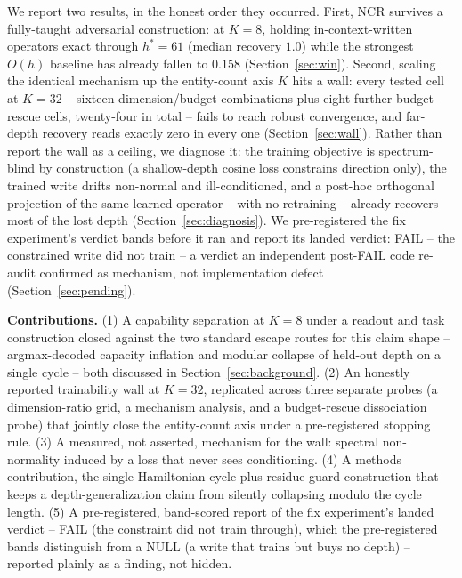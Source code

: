 We report two results, in the honest order they occurred. First, NCR
survives a fully-taught adversarial construction: at $K{=}8$, holding
in-context-written operators exact through $h^\ast{=}61$ (median recovery
$1.0$) while the strongest $O(h)$ baseline has already fallen to $0.158$
(Section~\ref{sec:win}). Second, scaling the identical mechanism up the
entity-count axis $K$ hits a wall: every tested cell at $K{=}32$ --
sixteen dimension/budget combinations plus eight further budget-rescue
cells, twenty-four in total -- fails to reach robust convergence, and
far-depth recovery reads exactly zero in every one
(Section~\ref{sec:wall}). Rather than report the wall as a ceiling, we
diagnose it: the training objective is spectrum-blind by construction
(a shallow-depth cosine loss constrains direction only), the trained
write drifts non-normal and ill-conditioned, and a post-hoc orthogonal
projection of the same learned operator -- with no retraining -- already
recovers most of the lost depth (Section~\ref{sec:diagnosis}). We
pre-registered the fix experiment's verdict bands before it ran and
report its landed verdict: FAIL -- the constrained write did not train --
a verdict an independent post-FAIL code re-audit confirmed as mechanism,
not implementation defect (Section~\ref{sec:pending}).

\textbf{Contributions.} (1) A capability separation at $K{=}8$ under a
readout and task construction closed against the two standard escape
routes for this claim shape -- argmax-decoded capacity inflation and
modular collapse of held-out depth on a single cycle -- both discussed in
Section~\ref{sec:background}. (2) An honestly reported trainability wall
at $K{=}32$, replicated across three separate probes (a dimension-ratio
grid, a mechanism analysis, and a budget-rescue dissociation probe) that
jointly close the entity-count axis under a pre-registered stopping rule.
(3) A measured, not asserted, mechanism for the wall: spectral
non-normality induced by a loss that never sees conditioning. (4) A
methods contribution, the single-Hamiltonian-cycle-plus-residue-guard
construction that keeps a depth-generalization claim from silently
collapsing modulo the cycle length. (5) A pre-registered, band-scored
report of the fix experiment's landed verdict -- FAIL (the constraint did
not train through), which the pre-registered bands distinguish from a
NULL (a write that trains but buys no depth) -- reported plainly as a
finding, not hidden.
